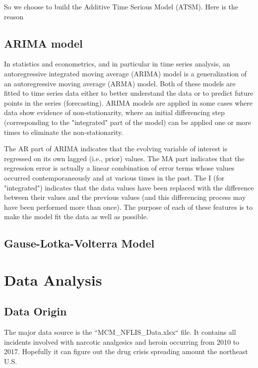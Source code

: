 \documentclass{mcmthesis}
\begin{document}
So we choose to build the Additive Time Serious Model (ATSM). Here is the reason
\subsection{ARIMA model}
\indent In statistics and econometrics, and in particular in time series analysis, an autoregressive integrated moving average (ARIMA) model is a generalization of an autoregressive moving average (ARMA) model. Both of these models are fitted to time series data either to better understand the data or to predict future points in the series (forecasting). ARIMA models are applied in some cases where data show evidence of non-stationarity, where an initial differencing step (corresponding to the "integrated" part of the model) can be applied one or more times to eliminate the non-stationarity.

The AR part of ARIMA indicates that the evolving variable of interest is regressed on its own lagged (i.e., prior) values. The MA part indicates that the regression error is actually a linear combination of error terms whose values occurred contemporaneously and at various times in the past. The I (for "integrated") indicates that the data values have been replaced with the difference between their values and the previous values (and this differencing process may have been performed more than once). The purpose of each of these features is to make the model fit the data as well as possible.

\subsection{Gause-Lotka-Volterra Model}

\section{Data Analysis}

\subsection{Data Origin}
The major data source is the ``MCM\_NFLIS\_Data.xlsx`` file. It contains all incidents involved with narcotic analgesics and heroin occurring from 2010 to 2017. Hopefully it can figure out the drug crisis spreading amount the northeast U.S.
\end{document}
